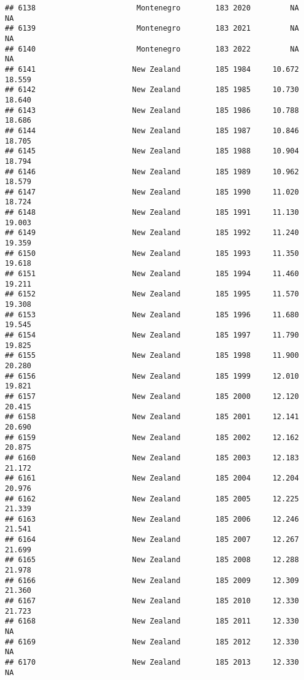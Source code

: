\documentclass[
]{article}
\begin{document}
\begin{verbatim}
## 6138                       Montenegro        183 2020         NA         NA
## 6139                       Montenegro        183 2021         NA         NA
## 6140                       Montenegro        183 2022         NA         NA
## 6141                      New Zealand        185 1984     10.672     18.559
## 6142                      New Zealand        185 1985     10.730     18.640
## 6143                      New Zealand        185 1986     10.788     18.686
## 6144                      New Zealand        185 1987     10.846     18.705
## 6145                      New Zealand        185 1988     10.904     18.794
## 6146                      New Zealand        185 1989     10.962     18.579
## 6147                      New Zealand        185 1990     11.020     18.724
## 6148                      New Zealand        185 1991     11.130     19.003
## 6149                      New Zealand        185 1992     11.240     19.359
## 6150                      New Zealand        185 1993     11.350     19.618
## 6151                      New Zealand        185 1994     11.460     19.211
## 6152                      New Zealand        185 1995     11.570     19.308
## 6153                      New Zealand        185 1996     11.680     19.545
## 6154                      New Zealand        185 1997     11.790     19.825
## 6155                      New Zealand        185 1998     11.900     20.280
## 6156                      New Zealand        185 1999     12.010     19.821
## 6157                      New Zealand        185 2000     12.120     20.415
## 6158                      New Zealand        185 2001     12.141     20.690
## 6159                      New Zealand        185 2002     12.162     20.875
## 6160                      New Zealand        185 2003     12.183     21.172
## 6161                      New Zealand        185 2004     12.204     20.976
## 6162                      New Zealand        185 2005     12.225     21.339
## 6163                      New Zealand        185 2006     12.246     21.541
## 6164                      New Zealand        185 2007     12.267     21.699
## 6165                      New Zealand        185 2008     12.288     21.978
## 6166                      New Zealand        185 2009     12.309     21.360
## 6167                      New Zealand        185 2010     12.330     21.723
## 6168                      New Zealand        185 2011     12.330         NA
## 6169                      New Zealand        185 2012     12.330         NA
## 6170                      New Zealand        185 2013     12.330         NA

\end{verbatim}
\end{document}
